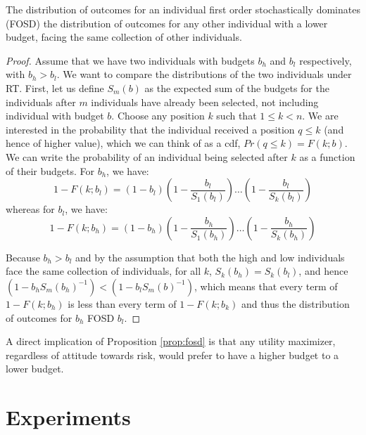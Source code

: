 \documentclass[prodmode,acmec]{acmsmall}
\begin{document}
\begin{proposition} \label{prop:fosd}
The distribution of outcomes for an individual first order
stochastically dominates (FOSD) the distribution of outcomes for any
other individual with a lower budget, facing the same collection of
other individuals.
\end{proposition}
\begin{proof}
  Assume that we have two individuals with budgets $b_h$ and $b_l$
  respectively, with $b_h > b_l$. We want to compare the
  distributions of the two individuals under RT. First, let us define
  $S_m(b)$ as the expected sum of the budgets for the individuals
  after $m$ individuals have already been selected, not including
  individual with budget $b$. Choose any position $k$ such that $1 \le
  k < n$.  We are interested in the probability that the individual
  received a position $q \le k$ (and hence of higher value), which we
  can think of as a cdf, $Pr(q \le k) = F(k; b)$. We can write the
  probability of an individual being selected after $k$ as a function
  of their budgets. For $b_h$, we have: 
  \begin{equation*}
    1 - F(k; b_l) = \left(1-b_l\right)\left(1-\frac{b_l}{S_1(b_l)}\right)
    \ldots \left(1 - \frac{b_l}{S_k(b_l)} \right) 
    \end{equation*} 
whereas for $b_l$, we have: 
     \begin{equation*}
    1 - F(k; b_h) = \left(1-b_h\right)\left(1-\frac{b_h}{S_1(b_h)}\right)
    \ldots \left(1 - \frac{b_h}{S_k(b_h)} \right) 
    \end{equation*} 
     
Because $b_h > b_l$ and by the assumption that both the high and low
individuals face the same collection of individuals, for all $k$,
$S_k(b_h) = S_k(b_l)$, and hence $(1-b_h S_m(b_h)^{-1}) < (1-b_l
S_m(b)^{-1})$, which means that every term of $1-F(k; b_h)$ is less
than every term of $1-F(k; b_k)$ and thus the distribution of outcomes
for $b_h$ FOSD $b_l$.
\end{proof} 

A direct implication of Proposition \ref{prop:fosd} is that any
utility maximizer, regardless of attitude towards risk, would prefer
to have a higher budget to a lower budget.

\section{Experiments}
\label{sec:expr}
\end{document}
